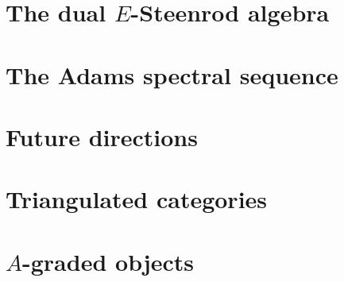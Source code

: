 \documentclass{amsart}
\theoremstyle{plain}
\theoremstyle{definition}
\newcommand{\0}{\mathbf{0}}
\renewcommand{\(}{\left(}
\renewcommand{\)}{\right)}
\newcommand{\1}{\mbf{1}}
\begin{document}


\section{The dual \texorpdfstring{$E$}{E}-Steenrod algebra}\label{section:dual_E-Steenrod_algebra}\label{section{dual_E-Steenrod}}



\section{The Adams spectral sequence}\label{section:ASS}



%

%
%
%

\section{Future directions}\label{section:future}



\appendix

\section{Triangulated categories}\label{appendix:triangulated}



\section{\texorpdfstring{$A$}{A}-graded objects}\label{appendix:graded_stuff}
\end{document}
